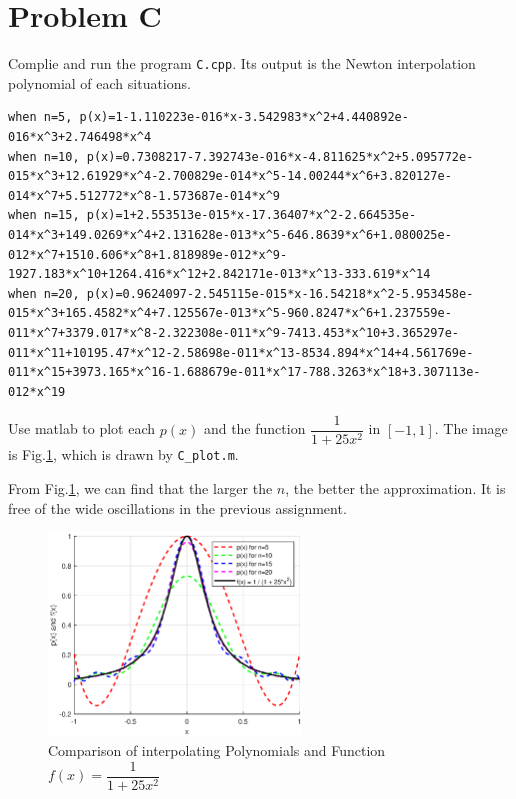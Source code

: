 \documentclass[a4paper]{article}
\begin{document}
\section*{Problem C}
Complie and run the program \verb|C.cpp|. Its output is the Newton interpolation polynomial of each situations.
\begin{lstlisting}[breaklines=true]
when n=5, p(x)=1-1.110223e-016*x-3.542983*x^2+4.440892e-016*x^3+2.746498*x^4
when n=10, p(x)=0.7308217-7.392743e-016*x-4.811625*x^2+5.095772e-015*x^3+12.61929*x^4-2.700829e-014*x^5-14.00244*x^6+3.820127e-014*x^7+5.512772*x^8-1.573687e-014*x^9
when n=15, p(x)=1+2.553513e-015*x-17.36407*x^2-2.664535e-014*x^3+149.0269*x^4+2.131628e-013*x^5-646.8639*x^6+1.080025e-012*x^7+1510.606*x^8+1.818989e-012*x^9-1927.183*x^10+1264.416*x^12+2.842171e-013*x^13-333.619*x^14
when n=20, p(x)=0.9624097-2.545115e-015*x-16.54218*x^2-5.953458e-015*x^3+165.4582*x^4+7.125567e-013*x^5-960.8247*x^6+1.237559e-011*x^7+3379.017*x^8-2.322308e-011*x^9-7413.453*x^10+3.365297e-011*x^11+10195.47*x^12-2.58698e-011*x^13-8534.894*x^14+4.561769e-011*x^15+3973.165*x^16-1.688679e-011*x^17-788.3263*x^18+3.307113e-012*x^19
\end{lstlisting}

Use matlab to plot each $p(x)$ and the function $\dfrac{1}{1+25x^2}$ in $[-1,1]$. The image is Fig.\ref{fig2}, which is drawn by \verb|C_plot.m|.

From Fig.\ref{fig2}, we can find that the larger the $n$, the better the approximation. It is free of the wide oscillations in the previous assignment.
\begin{figure}[htbp]
  \centering
  \includegraphics[width=0.6\textwidth]{images/C_pic.eps}  
  \renewcommand{\figurename}{Fig.}
  \caption{Comparison of interpolating Polynomials and Function $f(x)=\dfrac{1}{1+25x^2}$}
  \label{fig2}
\end{figure}
\end{document}
